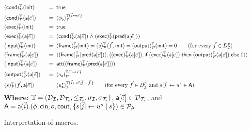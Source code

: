 \begin{figure}[t]
  \begin{alignat*}{2}
    &\interp{\mcond}{\TM}{\calp}(\tinit) &\;\;=\;\;& \true
    \\
    &\interp{\mcond}{\TM}{\calp}(\sfa[\pvec{e}]) &\;\;=\;\;&
    \interp{\phi_{\sfa}}{\TM\{\pvec{i} \mapsto \pvec{e}\}}{\calp}
    \\
    &\interp{\mexec}{\TM}{\calp}(\tinit) &\;\;=\;\;& \true
    \\
    &\interp{\mexec}{\TM}{\calp}(\sfa[\pvec{e}]) &\;\;=\;\;&
    \interp{\mcond}{\TM}{\calp}(\sfa[\pvec{e}])
    \dand
    \interp{\mexec}{\TM}{\calp}(\tpred{\sfa[\pvec{e}]})
    \\
    &\interp{\minp}{\TM}{\calp}(\tinit) &\;\;=\;\;& \interp{\mframe}{\TM}{\calp}(\tinit) = \interp{s}{\TM}{\calp}(\pvec{f},\tinit)
    = \interp{\mout}{\TM}{\calp}(\tinit) = 0
    \tag{for every $\vec{f} \in D_\I^p$}
    \\
    &\interp{\mframe}{\TM}{\calp}(\sfa[\pvec{e}]) &\;\;=\;\;&
    \langle \interp{\mframe}{\TM}{\calp}(\tpred{\sfa[\pvec{e}]}),
    \langle  \interp{\mexec}{\TM}{\calp}(\sfa[\pvec{e}]) ,   \myif \interp{\mexec}{\TM}{\calp}(\sfa[\pvec{e}]) \mythen \interp{\mout}{\TM}{\calp}(\sfa[\pvec{e}]) \myelse 0
    \rangle \rangle
    \\
    &\interp{\minp}{\TM}{\calp}(\sfa[\pvec{e}]) &\;\;=\;\;&
    \att(\interp{\mframe}{\TM}{\calp}(\tpred{\sfa[\pvec{e}]}))
    \\
    &\interp{\mout}{\TM}{\calp}(\sfa[\pvec{e}]) &\;\;=\;\;&
    \interp{o_{\sfa}}{\TM\{\pvec{i}\mapsto\pvec{e}\}}{\calp}
    \\
    &\interp{s}{\TM}{\calp}(\pvec{f},\sfa[\pvec{e}]) &\;\;=\;\;&
    \interp{u_{\sfa}^{s}}
    {\TM\{\pvec{i}\mapsto\pvec{e},\pvec{j}\mapsto\pvec{f}\}}{\calp}
    \tag{for every $\vec{f} \in D_\I^p$ and $s[\vec{j}] \leftarrow u^{s} \in \sfA$}
  \end{alignat*}
  \textbf{Where:} $\mathbb{T} = (\mathcal{D}_{\mathcal{I}}, \mathcal{D}_{\mathcal{T}_s}, \leq_{\mathcal{T}_s}, \sigma_{\mathcal{I}}, \sigma_{\mathcal{T}_s})$, $\sfa[\pvec{e}] \in \D_\XT$, and
  \(
    \textsf{A} = \textsf{a}(\vec{i}).(\phi, \mathsf{cin}, o, \mathsf{cout},
    \{s[\vec{j}] \leftarrow u^{s} \mid s\})
    \in \mathcal{P}_{\textsf{A}}
  \)
  \caption{Interpretation of macros.}
  \label{fig:inter-macros}
\end{figure}


